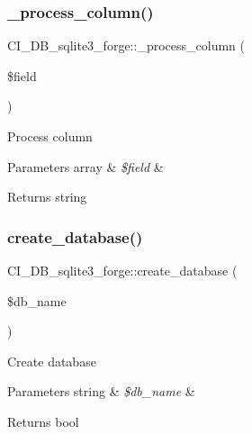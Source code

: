 \subsubsection{\texorpdfstring{\+\_\+process\+\_\+column()}{\_process\_column()}}
{\footnotesize\ttfamily C\+I\+\_\+\+D\+B\+\_\+sqlite3\+\_\+forge\+::\+\_\+process\+\_\+column (\begin{DoxyParamCaption}\item[{}]{\$field }\end{DoxyParamCaption})\hspace{0.3cm}{\ttfamily [protected]}}

Process column


\begin{DoxyParams}[1]{Parameters}
array & {\em \$field} & \\
\hline
\end{DoxyParams}
\begin{DoxyReturn}{Returns}
string 
\end{DoxyReturn}
\mbox{\label{class_c_i___d_b__sqlite3__forge_a7908704e6325a9100fba94b2496e3cc9}} 
\subsubsection{\texorpdfstring{create\+\_\+database()}{create\_database()}}
{\footnotesize\ttfamily C\+I\+\_\+\+D\+B\+\_\+sqlite3\+\_\+forge\+::create\+\_\+database (\begin{DoxyParamCaption}\item[{}]{\$db\+\_\+name }\end{DoxyParamCaption})}

Create database


\begin{DoxyParams}[1]{Parameters}
string & {\em \$db\+\_\+name} & \\
\hline
\end{DoxyParams}
\begin{DoxyReturn}{Returns}
bool 
\end{DoxyReturn}
\mbox{\label{class_c_i___d_b__sqlite3__forge_accdf0ec147800afe449b0f6c7f2b2ec0}} 
